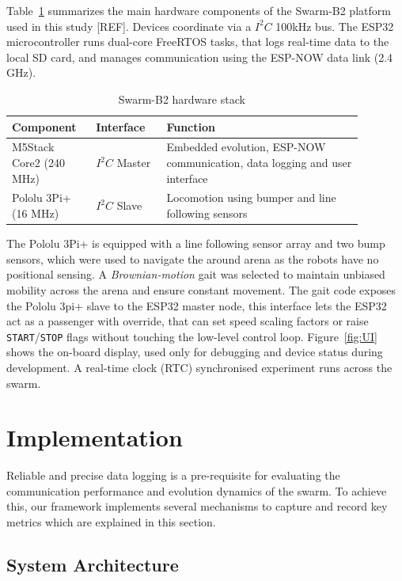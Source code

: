\documentclass[conference]{IEEEtran}
\begin{document}
Table~\ref{tab:B2-hardware} summarizes the main hardware components of the Swarm-B2 platform used in this study [REF]. Devices coordinate via a $I^2C$ 100kHz bus. The ESP32 microcontroller runs dual-core FreeRTOS tasks, that logs real-time data to the local SD card, and manages communication using the ESP-NOW data link (2.4 GHz). \\

\begin{table}[h]
  \centering
  \caption{Swarm-B2 hardware stack}
  \label{tab:B2-hardware}
  \begin{tabular}{p{0.20\linewidth} p{0.18\linewidth} p{0.50\linewidth}}
    \toprule
    Component & Interface & Function \\
    \midrule
    M5Stack Core2 (240 MHz) & $I^2C$ Master       & Embedded evolution, ESP-NOW communication, data logging and user interface \\
    Pololu 3Pi+ (16 MHz)    & $I^2C$ Slave        & Locomotion using bumper and line following sensors \\
    \bottomrule
  \end{tabular}
\end{table}

The Pololu 3Pi+ is equipped with a line following sensor array and two bump sensors, which were used to navigate the around arena as the robots have no positional sensing. A \emph{Brownian-motion} gait was selected to maintain unbiased mobility across the arena and ensure constant movement. The gait code exposes the Pololu 3pi+ slave to the ESP32 master node, this interface lets the ESP32 act as a passenger with override, that can set speed scaling factors or raise \texttt{START}/\texttt{STOP} flags without touching the low-level control loop. Figure~\ref{fig:UI} shows the on-board display, used only for debugging and device status during development. A real-time clock (RTC) synchronised experiment runs across the swarm.

\section{Implementation}\label{sec:implementation}
Reliable and precise data logging is a pre-requisite for evaluating the communication performance and evolution dynamics of the swarm. To achieve this, our framework implements several mechanisms to capture and record key metrics which are explained in this section.

\subsection{System Architecture}\label{sec:architecture}
\end{document}
